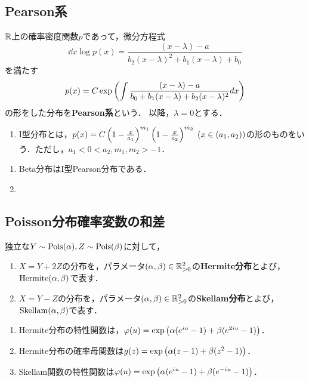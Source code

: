 \documentclass[uplatex,dvipdfmx]{jsreport}
\begin{document}
\subsection{Pearson系}

\begin{definition}
    $\mathbb{R}$上の確率密度関数$p$であって，微分方程式
    \[\dd{}{x}\log p(x)=\frac{(x-\lambda)-a}{b_2(x-\lambda)^2+b_1(x-\lambda)+b_0}\]
    を満たす
    \[p(x)=C\exp\left(\int\frac{(x-\lambda)-a}{b_0+b_1(x-\lambda)+b_2(x-\lambda)^2}dx\right)\]
    の形をした分布を\textbf{Pearson系}という．
    以降，$\lambda=0$とする．
    \begin{enumerate}
        \item I型分布とは，$p(x)=C\left(1-\frac{x}{a_1}\right)^{m_1}\left(1-\frac{x}{a_2}\right)^{m_2}\;(x\in(a_1,a_2))$の形のものをいう．ただし，$a_1<0<a_2,m_1,m_2>-1$．
    \end{enumerate}
\end{definition}
\begin{example}\mbox{}
    \begin{enumerate}
        \item Beta分布はI型Pearson分布である．
        \item 
    \end{enumerate}
\end{example}

\subsection{Poisson分布確率変数の和差}

\begin{definition}\label{def-Hermite-and-Skellam}
    独立な$Y\sim\mathrm{Pois}(\alpha),Z\sim\mathrm{Pois}(\beta)$に対して，
    \begin{enumerate}
        \item $X=Y+2Z$の分布を，パラメータ$(\alpha,\beta)\in\mathbb{R}_{>0}^2$の\textbf{Hermite分布}とよび，$\mathrm{Hermite}(\alpha,\beta)$で表す．
        \item $X=Y-Z$の分布を，パラメータ$(\alpha,\beta)\in\mathbb{R}_{>0}^2$の\textbf{Skellam分布}とよび，$\mathrm{Skellam}(\alpha,\beta)$で表す．
    \end{enumerate}
\end{definition}

\begin{lemma}\mbox{}
    \begin{enumerate}
        \item Hermite分布の特性関数は，$\varphi(u)=\exp\left(\alpha(e^{iu}-1)+\beta(e^{2iu}-1)\right)$．
        \item Hermite分布の確率母関数は$g(z)=\exp\left(\alpha(z-1)+\beta(z^2-1)\right)$．
        \item Skellam関数の特性関数は$\varphi(u)=\exp\left(\alpha(e^{iu}-1)+\beta(e^{-iu}-1)\right)$．
    \end{enumerate}
\end{lemma}
\end{document}
